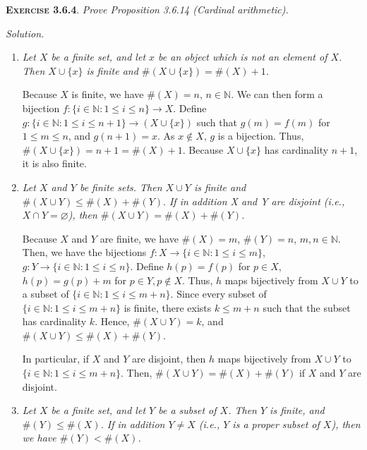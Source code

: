 \documentclass[12pt]{article}
\theoremstyle{remark}
\newenvironment{exer}[2]{
    \noindent \setlength{\parskip}{1em}%
    \textsc{\textbf{Exercise #1}}. \textit{#2} \par
    \noindent \textit{Solution.} %
}{\bigskip}
\begin{document}
\begin{exer}{3.6.4}{
    Prove Proposition 3.6.14 (Cardinal arithmetic).
}
    \begin{enumerate}[topsep=0mm,label=(\alph*)]
        \item \textit{%
            Let $X$ be a finite set, and let $x$ be an object which is not an element of $X$.
            Then $X \cup \{ x \}$ is finite and $\#(X \cup \{ x \}) = \#(X) + 1$.
        }

            Because $X$ is finite, we have $\#(X) = n$, $n \in \mathbb{N}$.
            We can then form a bijection $f : \{ i \in \mathbb{N} : 1 \le i \le n \} \to X$.
            Define $g : \{ i \in \mathbb{N} : 1 \le i \le n + 1 \} \to (X \cup \{ x \})$ such that $g(m) = f(m)$ for $1 \le m \le n$, and $g(n + 1) = x$.
            As $x \notin X$, $g$ is a bijection.
            Thus, $\#(X \cup \{ x \}) = n + 1 = \#(X) + 1$.
            Because $X \cup \{ x \}$ has cardinality $n + 1$, it is also finite.
            
        \item \textit{%
            Let $X$ and $Y$ be finite sets.
            Then $X \cup Y$ is finite and $\#(X \cup Y ) \le \#(X) + \#(Y).$
            If in addition X and Y are disjoint (i.e., $X \cap Y = \varnothing$), then $\#(X \cup Y) = \#(X) + \#(Y)$.
        }

            Because $X$ and $Y$ are finite, we have $\#(X) = m$, $\#(Y) = n$, $m, n \in \mathbb{N}$.
            Then, we have the bijections $f : X \to \{ i \in \mathbb{N} : 1 \le i \le m \}$, $g : Y \to \{ i \in \mathbb{N} : 1 \le i \le n \}$.
            Define $h(p) = f(p)$ for $p \in X$, $h(p) = g(p) + m$ for $p \in Y, p \notin X$.
            Thus, $h$ maps bijectively from $X \cup Y$ to a subset of $\{ i \in \mathbb{N} : 1 \le i \le m + n \}$.
            Since every subset of $\{ i \in \mathbb{N} : 1 \le i \le m + n \}$ is finite, there exists $k \le m + n$ such that the subset has cardinality $k$.
            Hence, $\#(X \cup Y) = k$, and $\#(X \cup Y) \le \#(X) + \#(Y)$.
            
            In particular, if $X$ and $Y$ are disjoint, then $h$ maps bijectively from $X \cup Y$ to $\{ i \in \mathbb{N} : 1 \le i \le m +n \}$.
            Then, $\#(X \cup Y) = \#(X) + \#(Y)$ if $X$ and $Y$ are disjoint.

        \item \textit{%
            Let $X$ be a finite set, and let $Y$ be a subset of $X$.
            Then $Y$ is finite, and $\#(Y) \le \#(X)$.
            If in addition $Y \ne X$ (i.e., $Y$ is a proper subset of $X$), then we have $\#(Y) < \#(X)$.
        }


\end{enumerate}
\end{exer}
\end{document}
